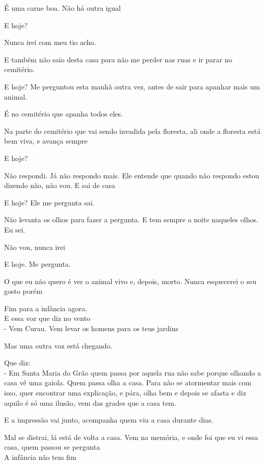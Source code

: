 É uma carne boa. Não há outra igual

E hoje?

Nunca irei com meu tio acho.

E também não saio desta casa para não me perder nas ruas e ir parar no
cemitério.

E hoje? Me perguntou esta manhã outra vez, antes de sair para apanhar
mais um animal.

É no cemitério que apanha todos eles.

Na parte do cemitério que vai sendo invadida pela floresta, ali onde a
floresta está bem viva, e avança sempre

E hoje?

Não respondi. Já não respondo mais. Ele entende que quando não respondo
estou dizendo não, não vou. E sai de casa

E hoje? Ele me pergunta sai.

Não levanta os olhos para fazer a pergunta. E tem sempre a noite
naqueles olhos. Eu sei.

Não vou, nunca irei

E hoje. Me pergunta.

O que eu não quero é ver o animal vivo e, depois, morto. Nunca
esquecerei o seu gosto porém

\pagebreak

Fim para a infância agora.\\

E essa voz que diz no vento\\

- Vem Curau. Vem levar os homens para os teus jardins\\

\pagebreak

Mas uma outra voz está chegando.

Que diz:\\

- Em Santa Maria do Grão quem passa por aquela rua não sabe porque
olhando a casa vê uma gaiola. Quem passa olha a casa. Para não se
atormentar mais com isso, quer encontrar uma explicação, e pára, olha
bem e depois se afasta e diz aquilo é só uma ilusão, vem das grades que
a casa tem.

E a impressão vai junto, acompanha quem viu a casa durante dias.

Mal se distrai, lá está de volta a casa. Vem na memória, e onde foi que
eu vi essa casa, quem passou se pergunta\\

A infância não tem fim

